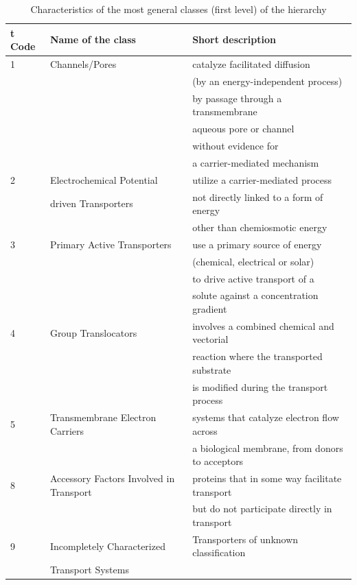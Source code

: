 \documentclass[english]{article}
\begin{document}
\begin{table}[!h]
\caption {Characteristics of the most general classes (first level) of the hierarchy}
\label{tab:first-level}
\vskip 0.05in
\hspace{-2cm}
\begin{tabular}{| l | l | l |}
\hline t
\textbf{Code}  & \textbf{Name of the class} 		&		\textbf{Short description}	 \\ 
 \hline
 1    & Channels/Pores  &  catalyze facilitated diffusion  \\
       &     & (by an energy-independent process) \\
   &     &   by passage through a transmembrane  \\
   &     &   aqueous pore or channel \\
   &     &   without evidence for \\
   &     &   a carrier-mediated mechanism \\ \hline
2  &  Electrochemical Potential  & utilize a carrier-mediated process \\
   &   driven Transporters  &  not directly linked to a form of energy \\ 
   &     &   other than chemiosmotic energy   \\ \hline
 3     & Primary Active Transporters  &  use a primary source of energy \\ 
   &     &   (chemical, electrical or solar) \\ 
   &     &   to drive active transport of a \\ 
   &     &    solute against a concentration gradient  \\ \hline
 4      & Group Translocators  &  involves a combined chemical and vectorial \\
   &     &   reaction where the transported substrate\\
      &     &   is modified during the transport process  \\ \hline
5  & Transmembrane Electron Carriers  &   systems that catalyze electron flow across\\
       &     &    a biological membrane, from donors to acceptors    \\ \hline
 8   & Accessory Factors Involved in Transport  &   proteins that in some way facilitate transport  \\
       &     &  but do not participate directly in transport  \\ \hline
 9 &Incompletely Characterized &  Transporters of unknown classification\\
  &   Transport Systems  & \\ \hline
\hline
\end{tabular}
\normalsize
\end{table}
\end{document}
